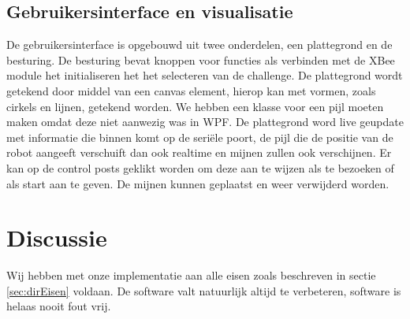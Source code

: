 \documentclass{report}
\begin{document}
\subsection{Gebruikersinterface en visualisatie}
De gebruikersinterface is opgebouwd uit twee onderdelen, een plattegrond en de besturing.
De besturing bevat knoppen voor functies als verbinden met de XBee module het initialiseren het het selecteren van de challenge.
De plattegrond wordt getekend door middel van een canvas element, hierop kan met vormen, zoals cirkels en lijnen, getekend worden. We hebben een klasse voor een pijl moeten maken omdat deze niet aanwezig was in WPF.
De plattegrond word live geupdate met informatie die binnen komt op de seriële poort, de pijl die de positie van de robot aangeeft verschuift dan ook realtime en mijnen zullen ook verschijnen.
Er kan op de control posts geklikt worden om deze aan te wijzen als te bezoeken of als start aan te geven.
De mijnen kunnen geplaatst en weer verwijderd worden.

\section{Discussie}
Wij hebben met onze implementatie aan alle eisen zoals beschreven in sectie \ref{sec:dirEisen} voldaan. De software valt natuurlijk altijd te verbeteren, software is helaas nooit fout vrij.
\end{document}
